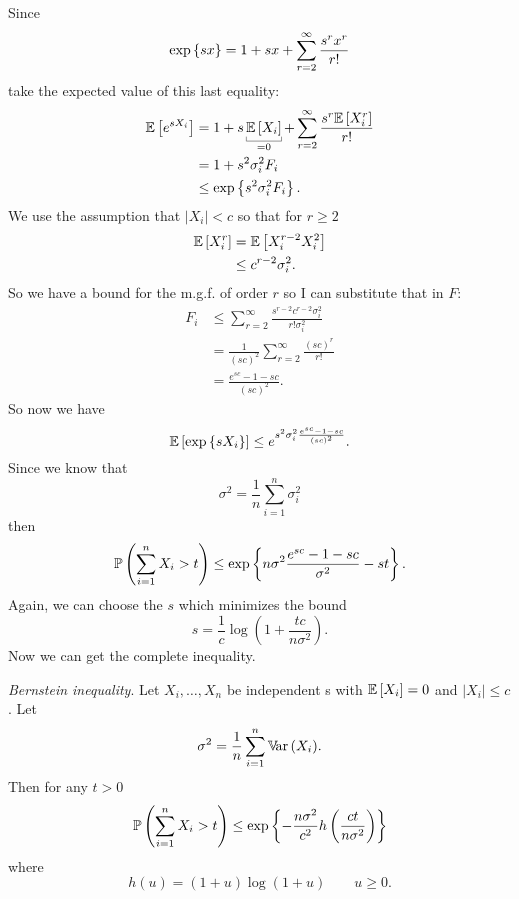 \documentclass[12pt]{report}
\begin{document}
\begin{itemize}
		Since 
		\begin{equation*}
			\exp\left\{sx\right\}=1+sx+\sum_{r=2}^{\infty}\frac{s^{r}x^{r}}{r!}
		\end{equation*}
		take the expected value of this last equality:
		\begin{align*}
			\ev{e^{sX_{i}}}&=1+s\ubracketthin{\ev{X_{i}}}_{=0}+\sum_{r=2}^{\infty}\frac{s^{r}\ev{X_{i}^{r}}}{r!}\\
			&=1+s^{2}\sigma^{2}_{i}F_{i}\\
			&\leq\expg{s^{2}\sigma^{2}_{i}F_{i}}.
		\end{align*}
		We use the assumption that $|X_{i}|<c$ so that for $r\geq 2$
		\begin{align*}
			\mathbb{E}\left[X_{i}^{r}\right]&=\mathbb{E}\left[X_{i}^{r-2}X_{i}^{2}\right]\\
			&\leq c^{r-2}\sigma^{2}_{i}.
		\end{align*}
		So we have a bound for the m.g.f. of order $r$ so I can substitute that in $F$:
		\begin{align*}
			F_{i}&\leq\sum_{r=2}^{\infty}\frac{s^{r-2}c^{r-2}\sigma^{2}_{i}}{r!\sigma^{2}_{i}}\\
			&=\frac{1}{(sc)^{2}}\sum_{r=2}^{\infty}\frac{(sc)^{r}}{r!}\\
			&=\frac{e^{sc}-1-sc}{(sc)^{2}}.
		\end{align*}
		So now we have 
		\begin{equation*}
			\mathbb{E}\left[\exp\left\{sX_{i}\right\}\right]\leq e^{s^{2}\sigma^{2}_{i}\frac{e^{sc}-1-sc}{(sc)^{2}}}.
		\end{equation*}
		Since we know that 
		\begin{equation*}
			\sigma^{2}=\frac{1}{n}\sum_{i=1}^{n}\sigma_{i}^{2}
		\end{equation*}
		then
		\begin{equation*}
			\mathbb{P}\left(\sum_{i=1}^{n}X_{i}>t\right)\leq\exp\left\{n\sigma^{2}\frac{e^{sc}-1-sc}{\sigma^{2}}-st\right\}.
		\end{equation*}
		Again, we can choose the $s$ which minimizes the bound
		\begin{equation*}
			s=\frac{1}{c}\log\left(1+\frac{tc}{n\sigma^{2}}\right).
		\end{equation*}
		Now we can get the complete inequality.
		\begin{theorem}
			\emph{Bernstein inequality}. Let $X_{i},\ldots,X_{n}$ be independent \rv s with $\mathbb{E}\left[X_{i}\right]=0$ and $|X_{i}|\leq c$. Let
			\begin{equation*}
				\sigma^{2}=\frac{1}{n}\sum_{i=1}^{n}\mathbb{V}\!\mathrm{ar}\,(X_{i}).
			\end{equation*}
			Then for any $t>0$
			\begin{equation*}
				\mathbb{P}\left(\sum_{i=1}^{n}X_{i}>t\right)\leq\exp\left\{-\frac{n\sigma^{2}}{c^{2}}h\left(\frac{ct}{n\sigma^{2}}\right)\right\}
			\end{equation*}
			where
			\begin{equation*}
				h(u)=(1+u)\log(1+u)\qquad u\geq0.
			\end{equation*}
		\end{theorem}
\end{itemize}
\end{document}
